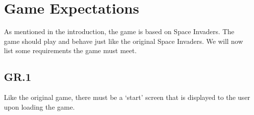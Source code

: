 \documentclass[12pt, letterpaper]{article}
\begin{document}
    
    
    \section{Game Expectations}
    
    As mentioned in the introduction, the game is based on Space Invaders. The game should play and behave just like the original Space Invaders. We will now list some requirements the game must meet. 
    
    \subsection*{GR.1}
    
    Like the original game, there must be a `start' screen that is displayed to the user upon loading the game. 
    
\end{document}
